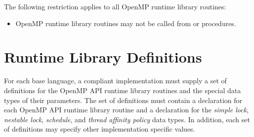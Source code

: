 \begin{samepage}
\vspace{1\baselineskip}
\begin{fortranspecific}
\vspace{-1\baselineskip}
\restrictions

The following restriction applies to all OpenMP runtime library routines:

\begin{itemize}
\item OpenMP runtime library routines may not be called from  or 
procedures.
\end{itemize}
\end{fortranspecific}
\end{samepage}











\section{Runtime Library Definitions}
\label{sec:runtime library definitions}
For each base language, a compliant implementation must supply a set of definitions for
the OpenMP API runtime library routines and the special data types of their parameters.
The set of definitions must contain a declaration for each OpenMP API runtime library
routine and a declaration for the \emph{simple lock}, \emph{nestable lock}, \emph{schedule}, and \emph{thread affinity
policy} data types. In addition, each set of definitions may specify other implementation
specific values.


